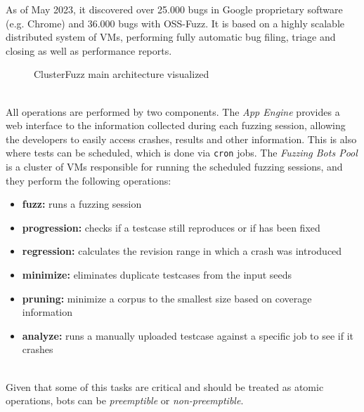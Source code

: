 As of May 2023, it discovered over 25.000 bugs in Google proprietary software (e.g. Chrome) and 36.000 bugs with OSS-Fuzz. \cite{clusterfuzz_docs}
It is based on a highly scalable distributed system of VMs, performing fully automatic bug filing, triage and closing as well as performance reports.
\begin{figure}[h]
\caption{ClusterFuzz main architecture visualized \cite{clusterfuzz_docs}}
\label{fig:clusterfuzz_architecture}
\end{figure}
\ \\
All operations are performed by two components.
The \textit{App Engine} provides a web interface to the information collected during each fuzzing session, allowing the developers to easily access crashes, results and other information. This is also where tests can be scheduled, which is done via \verb|cron| jobs.
The \textit{Fuzzing Bots Pool} is a cluster of VMs responsible for running the scheduled fuzzing sessions, and they perform the following operations:
\begin{itemize}
    \item \textbf{fuzz:} runs a fuzzing session
    \item \textbf{progression:} checks if a testcase still reproduces or if has been fixed
    \item \textbf{regression:} calculates the revision range in which a crash was introduced
    \item \textbf{minimize:} eliminates duplicate testcases from the input seeds
    \item \textbf{pruning:} minimize a corpus to the smallest size based on coverage information
    \item \textbf{analyze:} runs a manually uploaded testcase against a specific job to see if it crashes
\end{itemize}
\ \\
Given that some of this tasks are critical and should be treated as atomic operations, bots can be \textit{preemptible} or \textit{non-preemptible}.

